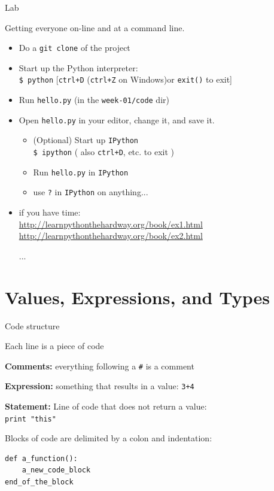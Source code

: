 \documentclass{beamer}
\begin{document}
\begin{frame}[fragile]{Lab}

{\Large Getting everyone on-line and at a command line.}

\begin{itemize}
    \item Do a \verb+git clone+ of the project
    \item Start up the Python interpreter:\\
          \verb+$ python+ [\verb=ctrl+D= (\verb|ctrl+Z| on Windows)or \verb|exit()| to exit]
    \item Run \verb+hello.py+ (in the \verb+week-01/code+ dir)
    \item Open \verb|hello.py| in your editor, change it, and save it.
    \begin{itemize}    
        \item (Optional) Start up \verb+IPython+ \\
          \verb+$ ipython+ ( also \verb=ctrl+D=, etc. to exit )
         \item Run \verb+hello.py+ in \verb+IPython+
         \item use \verb+?+ in \verb+IPython+ on anything...
    \end{itemize}    
    \item if you have time:\\
\url{http://learnpythonthehardway.org/book/ex1.html}\\
\url{http://learnpythonthehardway.org/book/ex2.html}

...
    
\end{itemize}

\end{frame} 


\section{Values, Expressions, and Types}

\begin{frame}[fragile]{Code structure}

\vfill
{\large Each line is a piece of code}

\vfill
{\large {\bf Comments:} everything following a \verb|#| is a comment}


\vfill
{\large {\bf Expression:} something that results in a value: \verb|3+4|}

\vfill
{\large {\bf Statement:} Line of code that does not return a value: \\
        \verb|print "this"|}

\vfill
{\large Blocks of code are delimited by a colon and indentation:
\begin{verbatim}
def a_function():
    a_new_code_block
end_of_the_block
\end{verbatim}
}

\vfill
\end{frame}
\end{document}
